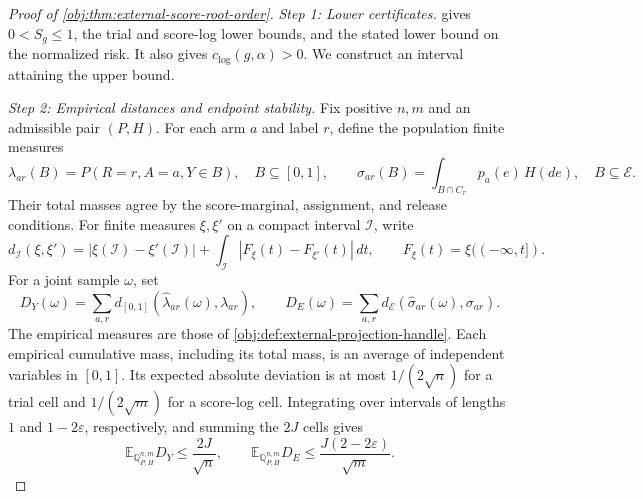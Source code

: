 \begin{proof}[Proof of \cref{obj:thm:external-score-root-order}]
\emph{Step 1: Lower certificates.}
 gives \(0<S_g\leq1\), the trial and score-log lower bounds, and the stated lower bound on the normalized risk. It also gives \(c_{\mathrm{log}}(g,\alpha)>0\). We construct an interval attaining the upper bound. %

\emph{Step 2: Empirical distances and endpoint stability.}
Fix positive \(n,m\) and an admissible pair \((P,H)\). For each arm \(a\) and label \(r\), define the population finite measures
\[
\lambda_{ar}(B)=P(R=r,A=a,Y\in B),\quad B\subseteq[0,1],
\qquad
\sigma_{ar}(B)=\int_{B\cap C_r}p_a(e)\,H(de),\quad B\subseteq\mathcal E.
\]
Their total masses agree by the score-marginal, assignment, and release conditions. For finite measures \(\xi,\xi'\) on a compact interval \(\mathcal I\), write
\[
d_{\mathcal I}(\xi,\xi')
=
|\xi(\mathcal I)-\xi'(\mathcal I)|
+\int_{\mathcal I}|F_\xi(t)-F_{\xi'}(t)|\,dt,
\qquad F_\xi(t)=\xi((-\infty,t]).
\]
For a joint sample \(\omega\), set
\[
D_Y(\omega)=\sum_{a,r}d_{[0,1]}(\widehat\lambda_{ar}(\omega),\lambda_{ar}),
\qquad
D_E(\omega)=\sum_{a,r}d_{\mathcal E}(\widehat\sigma_{ar}(\omega),\sigma_{ar}).
\]
The empirical measures are those of \cref{obj:def:external-projection-handle}. Each empirical cumulative mass, including its total mass, is an average of independent variables in \([0,1]\). Its expected absolute deviation is at most \(1/(2\sqrt n)\) for a trial cell and \(1/(2\sqrt m)\) for a score-log cell. Integrating over intervals of lengths \(1\) and \(1-2\varepsilon\), respectively, and summing the \(2J\) cells gives
\[
\mathbb E_{\mathbb Q_{P,H}^{n,m}}D_Y\leq\frac{2J}{\sqrt n},
\qquad
\mathbb E_{\mathbb Q_{P,H}^{n,m}}D_E
\leq\frac{J(2-2\varepsilon)}{\sqrt m}. \label{eq:external-root-order-mean}
\]


\end{proof}
